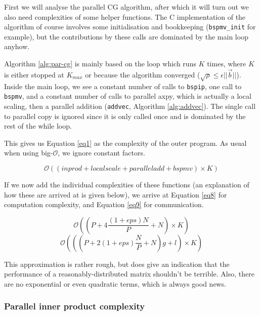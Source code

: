 \documentclass[a4paper]{article}
\newcommand{\ve}[1]{\ensuremath{\vec{#1}}}
\begin{document}
First we will analyse the parallel CG algorithm, after which it will turn out we also need
complexities of some helper functions. The C implementation of the algorithm of course
involves some initialisation and bookkeeping (\texttt{bspmv\_init} for example), but the
contributions by these calls are dominated by the main loop anyhow.

Algorithm \ref{alg:par-cg} is mainly based on the loop which runs $K$ times, where $K$ is
either stopped at $K_{max}$ or because the algorithm converged ($\sqrt \rho \leq \epsilon || \ve b||$).
Inside the main loop, we see a constant number of calls to \texttt{bspip}, one call to \texttt{bspmv}, and a constant
number of calls to parallel axpy, which is actually a local scaling, then a parallel addition (\texttt{addvec}, Algorithm \ref{alg:addvec}).
The single call to parallel copy is ignored since it is only called once and is dominated by the rest of the while loop.

This gives us Equation \ref{eq1} as the complexity of the outer program. As usual when using big-$\mathcal{O}$, we ignore
constant factors.

\begin{equation}
   \mathcal{O}\left( (inprod + localscale + paralleladd + bspmv)\times K \right)
    \label{eq1}
\end{equation}

If we now add the individual complexities of these functions
(an explanation of how these are arrived at is given below), we
arrive at Equation \ref{eq8} for computation complexity, and Equation
\ref{eq9} for communication.

\begin{equation}
   \mathcal{O}\left( \left(P+4\frac{\left(1+eps\right) N}{P} + N\right) \times K\right)
    \label{eq8}
\end{equation}
\begin{equation}
   \mathcal{O}\left( \left( \left( P + 2\left(1+eps\right)\frac{N}{P} + N \right)g + l\right) \times K\right)
    \label{eq9}
\end{equation}

This approximation is rather rough, but does give an indication
that the performance of a reasonably-distributed matrix shouldn't
be terrible. Also, there are no exponential or even quadratic terms,
which is always good news.

\subsubsection{Parallel inner product complexity}
\end{document}
